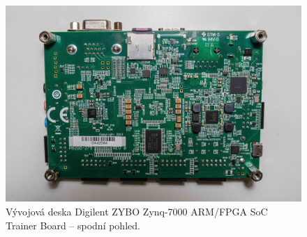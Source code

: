 \documentclass[a4paper, twoside, 11pt]{article}
\begin{document}
				\begin{figure}[H]
					\centering
						\includegraphics[width=1\textwidth]{src/jpg/digilent-zybo-foto-3.jpeg} 
						\caption{Vývojová deska Digilent ZYBO Zynq-7000 ARM/FPGA SoC Trainer Board – spodní pohled.}
						\label{fig:digilent-zybo-foto-3}
				\end{figure}
\end{document}

